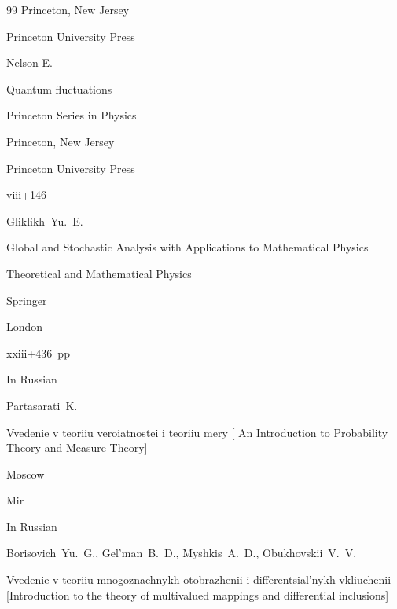 \begin{thebibliography}{99}
\publaddr Princeton, New Jersey

\publ Princeton University Press







\by Nelson E.

\book Quantum fluctuations

\serial Princeton Series in Physics

\publaddr Princeton, New Jersey

\publ Princeton University Press

\totalpages viii+146 





\by Gliklikh~Yu.~E. 

\book  Global and Stochastic Analysis with Applications to Mathematical Physics

\serial Theoretical and Mathematical Physics

\publ Springer

\publaddr London 


\totalpages xxiii+436~pp \nofrills





\lang In Russian

\by Partasarati~K.

\book Vvedenie v teoriiu veroiatnostei i teoriiu mery \rm [ An Introduction to Probability Theory and Measure Theory]

\publaddr Moscow

\publ Mir 










\lang In Russian

\by Borisovich~Yu.~G., Gel'man~B.~D., Myshkis~A.~D., Obukhovskii~V.~V. 

\book Vvedenie v teoriiu mnogoznachnykh otobrazhenii i differentsial'nykh vkliuchenii  \rm [Introduction to the theory of multivalued mappings and differential inclusions]


\end{thebibliography}
